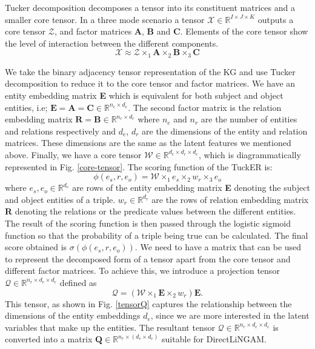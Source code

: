 \documentclass{article}
\begin{document}
Tucker decomposition decomposes a tensor into its constituent matrices and a smaller core tensor. In a three mode scenario a tensor $\mathcal{X} \in \mathbb{R}^{I \times J \times K}$ outputs a core tensor 
$\mathcal{Z}$, and factor matrices \textbf{A}, \textbf{B} and \textbf{C}. Elements of the core tensor show the level of interaction between the different components.
\begin{equation}
    \mathcal{X} \approx \mathcal{Z} \times_1 \textbf{A} \times_2 \textbf{B} \times_3 \textbf{C}
\end{equation}

We take the binary adjacency tensor representation of the KG and use Tucker decomposition to reduce it to the core tensor and factor matrices. We have an entity embedding matrix \textbf{E} which is equivalent for both subject and object entities, i.e; $\textbf{E} = \textbf{A} = \textbf{C} \in \mathbb{R}^{n_e \times d_e}$. The second factor matrix is the relation embedding matrix $\textbf{R} = \textbf{B} \in \mathbb{R}^{n_r \times d_r}$ where $n_e$ and $n_r$ are the number of entities and relations respectively and $d_e$, $d_r$ are the dimensions of the entity and relation matrices. These dimensions are the same as the latent features we mentioned above.
Finally, we have a core tensor $\mathcal{W} \in \mathbb{R}^{d_e \times d_r \times d_e}$, which is diagrammatically represented in Fig. \ref{core-tensor}. The scoring function of the TuckER is:
\begin{equation}
    \phi(e_s,r,e_o) = \mathcal{W} \times_1 e_s \times_2 w_r \times_3 e_o
\end{equation}
where $e_s,e_o \in \mathbb{R}^{d_e}$ are rows of the entity embedding matrix \textbf{E} denoting the subject and object entities of a triple. $w_r \in \mathbb{R}^{d_r}$ are the rows of relation embedding matrix \textbf{R} denoting the relations or the predicate values between the different entities. The result of the scoring function is then passed through the logistic sigmoid function so that the probability of a triple being true can be calculated. The final score obtained is $\sigma(\phi(e_s,r,e_o))$. We need to have a matrix that can be used to represent the decomposed form of a tensor apart from the core tensor and different factor matrices.
To achieve this, we introduce a projection tensor $\mathcal{Q} \in \mathbb{R}^{n_r \times d_e \times d_e}$ defined as
\begin{equation}
\label{q_tensor_eq}
    \mathcal{Q} = (\mathcal{W} \times_1 \textbf{E} \times_2 w_r) \textbf{E}.
\end{equation}
This tensor, as shown in Fig. \ref{tensorQ} captures the relationship between the dimensions of the entity embeddings $d_e$, since we are more interested in the latent variables that make up the entities. The resultant tensor $\mathcal{Q} \in \mathbb{R}^{n_r \times d_e \times d_e}$ is converted into a matrix $\textbf{Q} \in \mathbb{R}^{n_r \times (d_e\times d_e)}$ suitable for DirectLiNGAM.
\end{document}
